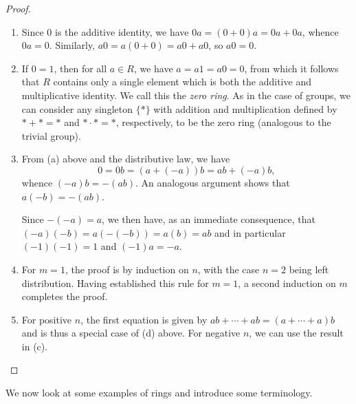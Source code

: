 \begin{proof}\(\)
    \begin{enumerate}[label=(\alph*), wide]
        \item Since \(0\) is the additive identity, we have \(0a = (0 + 0)a = 0a
        + 0a\), whence \(0a = 0\). Similarly, \(a0 = a(0 + 0) = a0 + a0\), so
        \(a0 = 0\).

        \item If \(0 = 1\), then for all \(a \in R\), we have \(a = a1 = a0 =
        0\), from which it follows that \(R\) contains only a single element
        which is both the additive and multiplicative identity. We call this the
        \emph{zero ring}. As in the case of groups, we can consider any
        singleton \(\{*\}\) with addition and multiplication defined by \(* + *
        = *\) and \(* \cdot * = *\), respectively, to be the zero ring
        (analogous to the trivial group).
        
        \item From (a) above and the distributive law, we have
        \[
            0 = 0b = (a + (-a))b = ab + (-a)b,
        \]
        whence \((-a)b = -(ab)\). An analogous argument shows that \(a(-b) =
        -(ab)\).

        Since \(-(-a) = a\), we then have, as an immediate consequence, that
        \((-a)(-b) = a(-(-b)) = a(b) = ab\) and in particular \((-1)(-1) = 1\)
        and \((-1)a = -a\).

        \item For \(m = 1\), the proof is by induction on \(n\), with the case
        \(n = 2\) being left distribution. Having established this rule for \(m
        = 1\), a second induction on \(m\) completes the proof.
        
        \item For positive \(n\), the first equation is given by \(ab + \cdots +
        ab = (a + \cdots + a)b\) and is thus a special case of (d) above. For
        negative \(n\), we can use the result in (c).
    \end{enumerate}
\end{proof}

We now look at some examples of rings and introduce some terminology.

